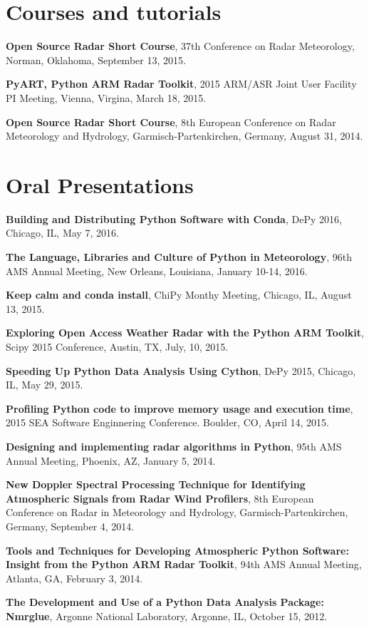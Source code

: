 \documentclass[margin,line]{res}
\begin{document}
\begin{resume}
\vspace{-0.1in}
\section{\sc Courses and tutorials}

{\bf Open Source Radar Short Course},
37th Conference on Radar Meteorology, Norman, Oklahoma, September 13, 2015.

{\bf PyART, Python ARM Radar Toolkit},
2015 ARM/ASR Joint User Facility PI Meeting, Vienna, Virgina, March 18, 2015.

{\bf Open Source Radar Short Course},
8th European Conference on Radar Meteorology and Hydrology,
Garmisch-Partenkirchen, Germany, August 31, 2014.

\section{\sc Oral Presentations}

{\bf Building and Distributing Python Software with Conda},
DePy 2016, Chicago, IL, May 7, 2016.

{\bf The Language, Libraries and Culture of Python in Meteorology},
96th AMS Annual Meeting, New Orleans, Louisiana, January 10-14, 2016.

{\bf Keep calm and conda install},
ChiPy Monthy Meeting, Chicago, IL, August 13, 2015.

{\bf Exploring Open Access Weather Radar with the Python ARM Toolkit},
Scipy 2015 Conference, Austin, TX, July, 10, 2015.

{\bf Speeding Up Python Data Analysis Using Cython},
DePy 2015, Chicago, IL, May 29, 2015.

{\bf Profiling Python code to improve memory usage and execution time},
2015 SEA Software Enginnering Conference. Boulder, CO, April 14, 2015.

{\bf Designing and implementing radar algorithms in Python},
95th AMS Annual Meeting, Phoenix, AZ, January 5, 2014.

{\bf New Doppler Spectral Processing Technique for Identifying
Atmospheric Signals from Radar Wind Profilers},
8th European Conference on Radar in Meteorology and Hydrology,
Garmisch-Partenkirchen, Germany, September 4, 2014.

{\bf Tools and Techniques for Developing Atmospheric Python Software:
Insight from the Python ARM Radar Toolkit},
94th AMS Annual Meeting, Atlanta, GA, February 3, 2014.

{\bf The Development and Use of a Python Data Analysis Package: Nmrglue},
Argonne National Laboratory, Argonne, IL, October 15, 2012.


\end{resume}
\end{document}
